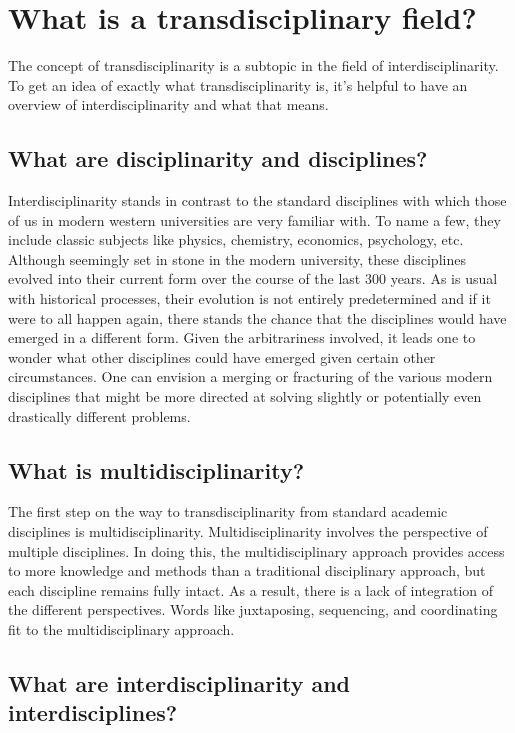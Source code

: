 \documentclass[a4paper]{article}
\begin{document}
\section{What is a transdisciplinary field?}

The concept of transdisciplinarity is a subtopic in the field of
interdisciplinarity. To get an idea of exactly what transdisciplinarity is,
it’s helpful to have an overview of interdisciplinarity and what that means.

\subsection{What are disciplinarity and disciplines?}

Interdisciplinarity stands in contrast to the standard disciplines with which
those of us in modern western universities are very familiar with. To name a
few, they include classic subjects like physics, chemistry, economics,
psychology, etc. Although seemingly set in stone in the modern university,
these disciplines evolved into their current form over the course of the last
300 years. As is usual with historical processes, their evolution is not
entirely predetermined and if it were to all happen again, there stands the
chance that the disciplines would have emerged in a different form. Given the
arbitrariness involved, it leads one to wonder what other disciplines could
have emerged given certain other circumstances. One can envision a merging or
fracturing of the various modern disciplines that might be more directed at
solving slightly or potentially even drastically different problems. 

\subsection{What is multidisciplinarity?}

The first step on the way to transdisciplinarity from standard academic
disciplines is multidisciplinarity. Multidisciplinarity involves the
perspective of multiple disciplines. In doing this, the multidisciplinary
approach provides access to more knowledge and methods than a traditional
disciplinary approach, but each discipline remains fully intact. As a result,
there is a lack of integration of the different perspectives. Words like
juxtaposing, sequencing, and coordinating fit to the multidisciplinary
approach.

\subsection{What are interdisciplinarity and interdisciplines?}
\end{document}
